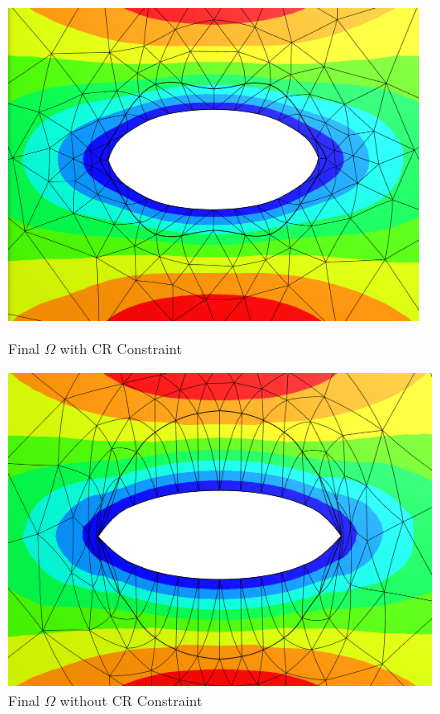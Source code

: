\pagebreak

\begin{figure}[h]
    \begin{minipage}{.5\textwidth}
        \centering
        \includegraphics[width=0.97\textwidth]{figures/mesh_good.PNG}
        \caption{Final $\Omega$ with CR Constraint}
        \label{plot_ref_good_mesh_u}
    \end{minipage}
    \begin{minipage}{.5\textwidth}
        \centering
        \includegraphics[width=1\textwidth]{figures/mesh_bad.PNG}
        \caption{Final $\Omega$ without CR Constraint}
        \label{plot_ref_bad_mesh_u}
    \end{minipage}
\end{figure}

